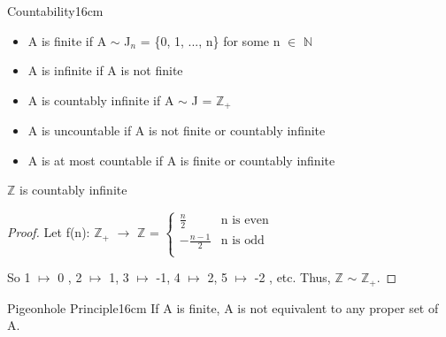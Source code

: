 	\vspace{0.5cm}



	\begin{definition}{Countability}{16cm}
		\begin{itemize}[leftmargin=1cm, itemsep=0.1cm]
			\item A is {\color{lblue} finite}
				if A $\sim$ J$_n$ = \{0, 1, ..., n\} for some n $\in$ $\mathbb{N}$

			\item A is {\color{lblue} infinite}
				if A is not finite
			
			\item A is {\color{lblue} countably infinite}
				if A $\sim$ J = $\mathbb{Z}_+$
			
			\item A is {\color{lblue} uncountable}
				if A is not finite or countably infinite
			
			\item A is {\color{lblue} at most countable}
				if A is finite or countably infinite
		\end{itemize}	
	\end{definition}

	\vspace{0.5cm}



	\begin{example}
		$\mathbb{Z}$ is countably infinite
	\end{example}
	
	\begin{proof}
		Let f(n): $\mathbb{Z}_+$ $\rightarrow$ $\mathbb{Z}$ = 
		$\begin{cases}
			\frac{n}{2} & \text{n is even} \\
			-\frac{n-1}{2} & \text{n is odd} \\
		\end{cases}$

		So 1 $\mapsto$ 0 , 2 $\mapsto$ 1, 3 $\mapsto$ -1, 4 $\mapsto$ 2,
		5 $\mapsto$ -2 , etc.
		Thus, $\mathbb{Z}$ $\sim$ $\mathbb{Z}_+$.
	\end{proof}

	\vspace{0.5cm}



	\begin{definition}{Pigeonhole Principle}{16cm}
		If A is finite, A is not equivalent to any proper set of A.
	\end{definition}
	



